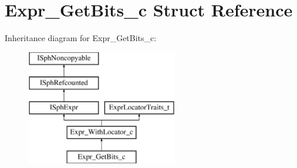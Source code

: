 \hypertarget{structExpr__GetBits__c}{\section{Expr\-\_\-\-Get\-Bits\-\_\-c Struct Reference}
\label{structExpr__GetBits__c}
}
Inheritance diagram for Expr\-\_\-\-Get\-Bits\-\_\-c\-:\begin{figure}[H]
\begin{center}
\leavevmode
\includegraphics[height=5.000000cm]{structExpr__GetBits__c}
\end{center}
\end{figure}
